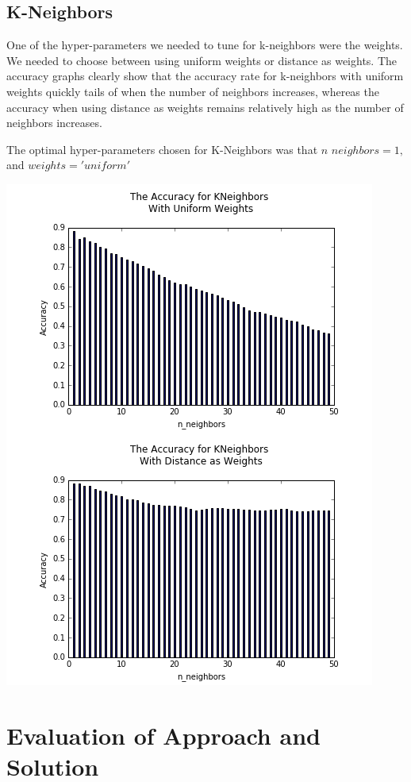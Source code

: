 \documentclass{article}
\begin{document}
\subsection{K-Neighbors}



One of the hyper-parameters we needed to tune for k-neighbors were the weights. We needed to choose between using uniform weights or distance as weights. The accuracy graphs clearly show that the accuracy rate for k-neighbors with uniform weights quickly tails of when the number of neighbors increases, whereas the accuracy when using distance as weights remains relatively high as the number of neighbors increases. 

The optimal hyper-parameters chosen for K-Neighbors was that $n$ \textunderscore $neighbors = 1,$ and $weights = 'uniform'$

\includegraphics[scale=0.6]{k-nboors}

\section{Evaluation of Approach and Solution} 
\end{document}
